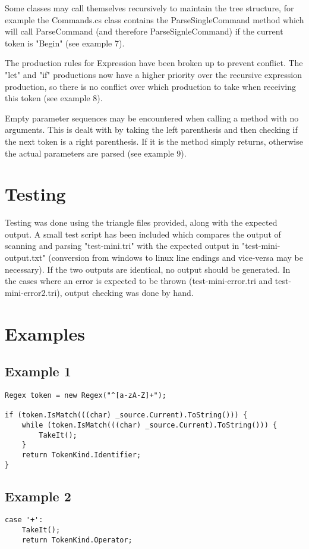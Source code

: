 \documentclass{article}
\begin{document}
Some classes may call themselves recursively to maintain the tree structure, for example the Commands.cs class contains the ParseSingleCommand method which will call ParseCommand (and therefore ParseSignleCommand) if the current token is "Begin" (see example 7).

The production rules for Expression have been broken up to prevent conflict. The "let" and "if" productions now have a higher priority over the recursive expression production, so there is no conflict over which production to take when receiving this token (see example 8).

Empty parameter sequences may be encountered when calling a method with no arguments. This is dealt with by taking the left parenthesis and then checking if the next token is a right parenthesis. If it is the method simply returns, otherwise the actual parameters are parsed (see example 9).

\section{Testing}
Testing was done using the triangle files provided, along with the expected output. A small test script has been included which compares the output of scanning and parsing "test-mini.tri" with the expected output in "test-mini-output.txt" (conversion from windows to linux line endings and vice-versa may be necessary). If the two outputs are identical, no output should be generated. In the cases where an error is expected to be thrown (test-mini-error.tri and test-mini-error2.tri), output checking was done by hand. 

\newpage
\section{Examples}
\subsection{Example 1}
\begin{lstlisting}
Regex token = new Regex("^[a-zA-Z]+");

if (token.IsMatch(((char) _source.Current).ToString())) {
	while (token.IsMatch(((char) _source.Current).ToString())) {
		TakeIt();
    }
	return TokenKind.Identifier;
}
\end{lstlisting}

\subsection{Example 2}
\begin{lstlisting}
case '+':
	TakeIt();
	return TokenKind.Operator;
\end{lstlisting}
\end{document}
